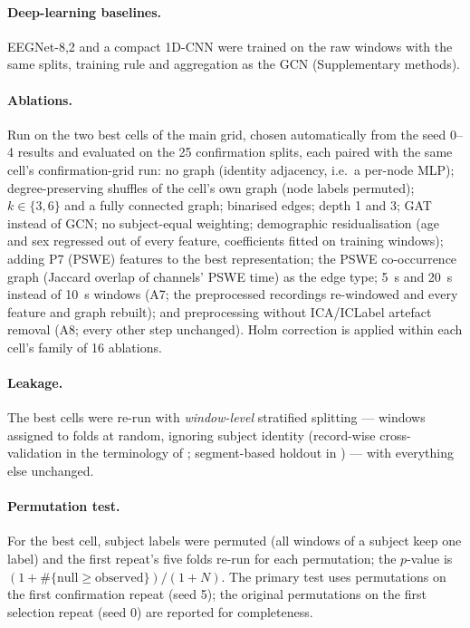 \paragraph{Deep-learning baselines.} EEGNet-8,2 \cite{F14} and a compact 1D-CNN were trained on the raw windows with the same splits, training rule and aggregation as the GCN (Supplementary methods).

\paragraph{Ablations.} Run on the two best cells of the main grid, chosen automatically from the
seed 0--4 results and evaluated on the 25 confirmation splits, each paired with the same cell's
confirmation-grid run: no graph (identity adjacency, i.e.\ a per-node MLP);
degree-preserving shuffles of the cell's own graph (node labels permuted); $k\in\{3,6\}$ and a fully connected graph; binarised edges; depth
1 and 3; GAT instead of GCN; no subject-equal weighting; demographic residualisation (age and sex
regressed out of every feature, coefficients fitted on training windows); adding P7 (PSWE) features
to the best representation; the PSWE co-occurrence graph (Jaccard overlap of channels' PSWE
time) as the edge type; \SI{5}{\second} and \SI{20}{\second} instead of \SI{10}{\second} windows (A7; the
preprocessed recordings re-windowed and every feature and graph rebuilt); and preprocessing without
ICA/ICLabel artefact removal (A8; every other step unchanged). Holm correction is applied within each
cell's family of 16 ablations.

\paragraph{Leakage.} The best cells were re-run with \emph{window-level} stratified splitting ---
windows assigned to folds at random, ignoring subject identity (record-wise cross-validation in the
terminology of \cite{L1}; segment-based holdout in \cite{L2}) --- with everything else unchanged.

\paragraph{Permutation test.} For the best cell, subject labels were permuted (all windows of a
subject keep one label) and the first repeat's five folds re-run for each permutation; the
$p$-value is $(1+\#\{\text{null}\ge\text{observed}\})/(1+N)$. The primary test uses
\cpermPThreespatialN{} permutations on the first confirmation repeat (seed 5); the original
\permPThreespatialN{} permutations on the first selection repeat (seed 0) are reported for
completeness.

